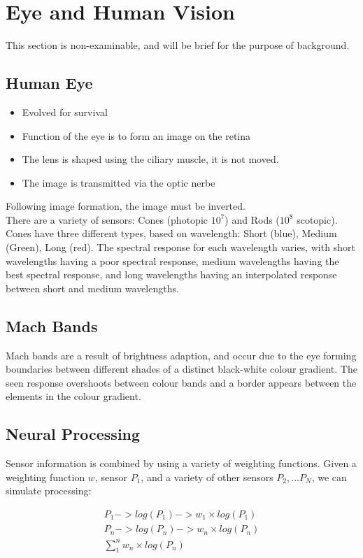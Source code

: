 \section{Eye and Human Vision}
This section is non-examinable, and will be brief for the purpose of background.

\subsection{Human Eye}
\begin{itemize}
    \itemsep0em
    \item Evolved for survival
    \item Function of the eye is to form an image on the retina
    \item The lens is shaped using the ciliary muscle, it is not moved.
    \item The image is transmitted via the optic nerbe
\end{itemize}
Following image formation, the image must be inverted. \\

There are a variety of sensors: Cones (photopic $10^7$) and Rods ($10^8$ scotopic). Cones have three different types, based on wavelength: Short (blue), Medium (Green), Long (red). The spectral response for each wavelength varies, with short wavelengths having a poor spectral response, medium wavelengths having the best spectral response, and long wavelengths having an interpolated response between short and medium wavelengths.

\subsection{Mach Bands}
Mach bands are a result of brightness adaption, and occur due to the eye forming boundaries between different shades of a distinct black-white colour gradient. The seen response overshoots between colour bands and a border appears between the elements in the colour gradient.

\subsection{Neural Processing}
Sensor information is combined by using a variety of weighting functions. Given a weighting function $w$, sensor $P_{1}$, and a variety of other sensors $P_{2}, ... P_{N}$, we can simulate processing:

\begin{align}
    P_{1} -> log(P_{1}) -> w_{1} \times log(P_{1}) \\
    P_{n} -> log(P_{n}) -> w_{n} \times log(P_{n}) \\
    \sum_{1}^{n} w_{n} \times log (P_{n})
\end{align}

